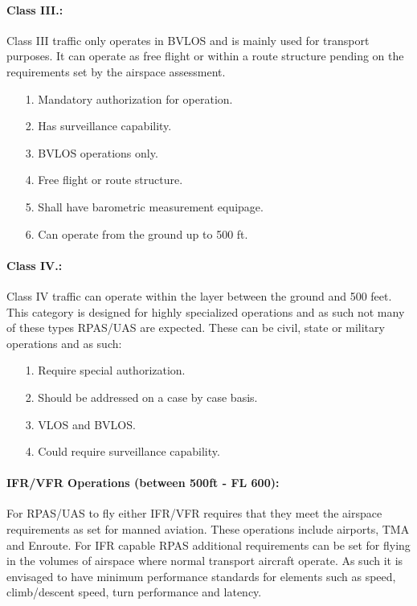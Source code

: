     
\paragraph{Class III.:} Class III traffic only operates in BVLOS and is mainly used for transport purposes. It can operate as free flight or within a route structure pending on the requirements set by the airspace assessment.
    \begin{itemize}
        \item[1.] Mandatory authorization for operation.
        
        \item[2.] Has surveillance capability.
        
        \item[3.] BVLOS operations only.
        
        \item[4.] Free flight or route structure.
        
        \item[5.] Shall have barometric measurement equipage.
        
        \item[6.] Can operate from the ground up to 500 ft.
    \end{itemize}
    
\paragraph{Class IV.:} Class IV traffic can operate within the layer between the ground and 500 feet. This category is designed for highly specialized operations and as such not many of these types RPAS/UAS are expected. These can be civil, state or military operations and as such:
    \begin{itemize}
        \item[1.] Require special authorization.
        
        \item[2.] Should be addressed on a case by case basis.
        
        \item[3.] VLOS and BVLOS.
        
        \item[4.] Could require surveillance capability.
    \end{itemize}

\paragraph{IFR/VFR Operations (between 500ft - FL 600):} For RPAS/UAS to fly either IFR/VFR requires that they meet the airspace requirements as set for manned aviation. These operations include airports, TMA and Enroute. For IFR capable RPAS additional requirements can be set for flying in the volumes of airspace where normal transport aircraft operate. As such it is envisaged to have minimum performance standards for elements such as speed, climb/descent speed, turn performance and latency.

